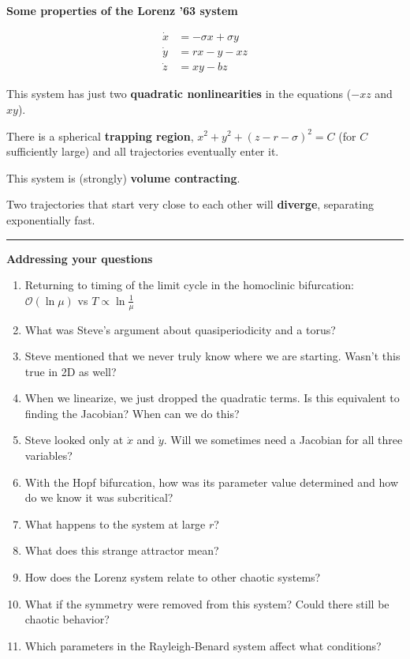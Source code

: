\documentclass[12pt,letterpaper,noanswers]{exam}
\begin{document}
\begin{tcolorbox}
\textbf{Some properties of the Lorenz '63 system}

\begin{align*}
\dot x &= -\sigma x + \sigma y \\
\dot y &= rx - y - xz \\
\dot z &= xy - bz
\end{align*}

This system has just two \textbf{quadratic nonlinearities} in the equations ($-xz$ and $xy$).

There is a spherical \textbf{trapping region}, $x^2+y^2 + (z-r-\sigma)^2 = C$ (for $C$ sufficiently large) and all trajectories eventually enter it. 

This system is (strongly) \textbf{volume contracting}.

Two trajectories that start very close to each other will \textbf{diverge}, separating exponentially fast.
\end{tcolorbox}

\vspace{0.2cm}
\hrule
\vspace{0.2cm}

\textbf{Addressing your questions}
\begin{enumerate}
    \item Returning to timing of the limit cycle in the homoclinic bifurcation: $\mathcal{O}(\ln \mu)$ vs $T\propto \ln \frac{1}{\mu}$
    \item What was Steve's argument about quasiperiodicity and a torus?
    \item Steve mentioned that we never truly know where we are starting.  Wasn't this true in 2D as well?
    \item When we linearize, we just dropped the quadratic terms.  Is this equivalent to finding the Jacobian?  When can we do this?
        \item Steve looked only at $\dot x$ and $\dot y$.  Will we sometimes need a Jacobian for all three variables?
        \item With the Hopf bifurcation, how was its parameter value determined and how do we know it was subcritical?
        \item What happens to the system at large $r$?
    \item What does this strange attractor mean?
    \item How does the Lorenz system relate to other chaotic systems?
    \item What if the symmetry were removed from this system?  Could there still be chaotic behavior?
    \item Which parameters in the Rayleigh-Benard system affect what conditions?

    
\end{enumerate}
\end{document}
